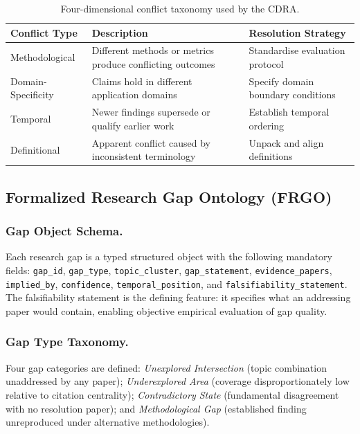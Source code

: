 \documentclass{llncs}
\begin{document}
\begin{table}[htbp]
\centering
\caption{Four-dimensional conflict taxonomy used by the CDRA.}
\label{tab:taxonomy}
\begin{tabular}{p{2.8cm}p{5.2cm}p{2.5cm}}
\toprule
\textbf{Conflict Type} & \textbf{Description} & \textbf{Resolution Strategy} \\
\midrule
Methodological & Different methods or metrics produce conflicting outcomes & Standardise evaluation protocol \\
\addlinespace[2pt]
Domain-Specificity & Claims hold in different application domains & Specify domain boundary conditions \\
\addlinespace[2pt]
Temporal & Newer findings supersede or qualify earlier work & Establish temporal ordering \\
\addlinespace[2pt]
Definitional & Apparent conflict caused by inconsistent terminology & Unpack and align definitions \\
\bottomrule
\end{tabular}
\end{table}

\subsection{Formalized Research Gap Ontology (FRGO)}

\subsubsection{Gap Object Schema.}

Each research gap is a typed structured object with the following mandatory
fields: \texttt{gap\_id}, \texttt{gap\_type}, \texttt{topic\_cluster},
\texttt{gap\_statement}, \texttt{evidence\_papers}, \texttt{implied\_by},
\texttt{confidence}, \texttt{temporal\_position}, and
\texttt{falsifiability\_statement}. The falsifiability statement is the
defining feature: it specifies what an addressing paper would contain,
enabling objective empirical evaluation of gap quality.

\subsubsection{Gap Type Taxonomy.}

Four gap categories are defined:
\textit{Unexplored Intersection} (topic combination unaddressed by any paper);
\textit{Underexplored Area} (coverage disproportionately low relative to
citation centrality);
\textit{Contradictory State} (fundamental disagreement with no resolution
paper); and
\textit{Methodological Gap} (established finding unreproduced under alternative
methodologies).
\end{document}
